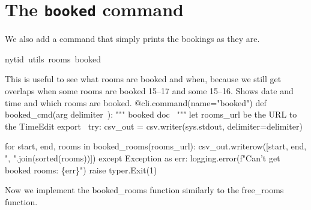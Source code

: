 \section{The \texttt{booked} command}

We also add a command that simply prints the bookings as they are.
\begin{center}
{\Tt{}nytid\ utils\ rooms\ booked\nwendquote}
\end{center}
This is useful to see what rooms are booked and when, because we still get 
overlaps when some rooms are booked 15--17 and some 15--16.
\nwenddocs{}\endmoddef\nwstartdeflinemarkup{}\nwenddeflinemarkup
Shows date and time and which rooms are booked.
\nwendcode{}\plusendmoddef\nwstartdeflinemarkup{}\nwenddeflinemarkup
@cli.command(name="booked")
def booked_cmd(\LA{}arg \code{}delimiter\edoc{}~{\nwtagstyle{}}\RA{}):
  """
  \LA{}\code{}booked\edoc{} doc~{\nwtagstyle{}}\RA{}
  """
  \LA{}let \code{}rooms{\_}url\edoc{} be the URL to the TimeEdit export~{\nwtagstyle{}}\RA{}
  try:
    csv_out = csv.writer(sys.stdout, delimiter=delimiter)

    for start, end, rooms in booked_rooms(rooms_url):
      csv_out.writerow([start, end, ", ".join(sorted(rooms))])
  except Exception as err:
    logging.error(f"Can't get booked rooms: \{err\}")
    raise typer.Exit(1)
\nwendcode{}\nwdocspar

Now we implement the {\Tt{}booked{\_}rooms\nwendquote} function similarly to the {\Tt{}free{\_}rooms\nwendquote} 
function.
\nwenddocs{}

